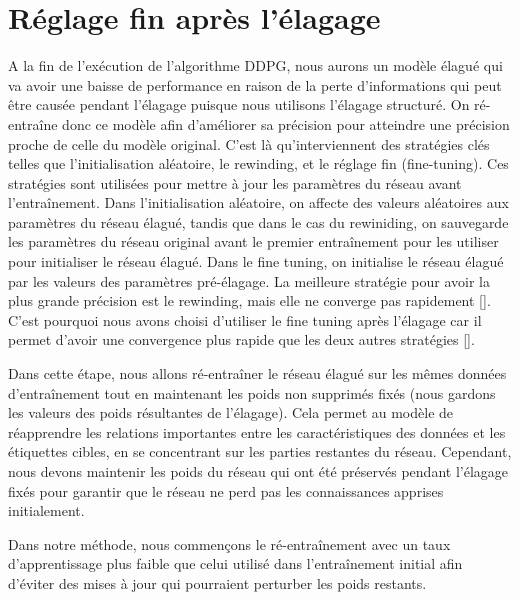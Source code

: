 \section{Réglage fin après l'élagage}
A la fin de l'exécution de l'algorithme DDPG, nous aurons un modèle élagué qui va avoir une baisse de performance en raison de la perte d'informations qui peut être causée pendant l'élagage puisque nous utilisons l'élagage structuré. On ré-entraîne donc ce modèle afin d'améliorer sa précision pour atteindre une précision proche de celle du modèle original. C'est là qu'interviennent des stratégies clés telles que l'initialisation aléatoire, le rewinding, et le réglage fin (fine-tuning). Ces stratégies sont utilisées pour mettre à jour les paramètres du réseau avant l'entraînement. Dans l'initialisation aléatoire, on affecte des valeurs aléatoires aux paramètres du réseau élagué, tandis que dans le cas du rewiniding, on sauvegarde les paramètres du réseau original avant le premier entraînement pour les utiliser pour initialiser le réseau élagué. Dans le fine tuning, on initialise le réseau élagué par les valeurs des paramètres pré-élagage. La meilleure stratégie pour avoir la plus grande précision est le rewinding, mais elle ne converge pas rapidement [\cite{pfe2022}]. C'est pourquoi nous avons choisi d'utiliser le fine tuning après l'élagage car il permet d'avoir une convergence plus rapide que les deux autres stratégies [\cite{pfe2022}].

Dans cette étape, nous allons ré-entraîner le réseau élagué sur les mêmes données d'entraînement tout en maintenant les poids non supprimés fixés (nous gardons les valeurs des poids résultantes de l'élagage). Cela permet au modèle de réapprendre les relations importantes entre les caractéristiques des données et les étiquettes cibles, en se concentrant sur les parties restantes du réseau. Cependant, nous devons maintenir les poids du réseau qui ont été préservés pendant l'élagage fixés pour garantir que le réseau ne perd pas les connaissances apprises initialement.

Dans notre méthode, nous commençons le ré-entraînement avec un taux d'apprentissage plus faible que celui utilisé dans l'entraînement initial afin d'éviter des mises à jour qui pourraient perturber les poids restants.

